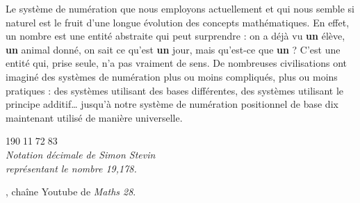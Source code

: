 \vspace*{-2mm}

\begin{debat}
    Le système de numération que nous employons actuellement et qui nous semble si naturel est le fruit d'une longue évolution des concepts mathématiques. En effet, un nombre est une entité abstraite qui peut surprendre : on a déjà vu {\bf un} élève, {\bf un} animal donné, on sait ce qu'est {\bf un} jour, mais qu'est-ce que {\bf un} ? C'est une entité qui, prise seule, n'a pas vraiment de sens. De nombreuses civilisations ont imaginé des systèmes de numération plus ou moins compliqués, plus ou moins pratiques : des systèmes utilisant des bases différentes, des systèmes utilisant le principe additif\dots{} jusqu'à notre système de numération positionnel de base dix maintenant utilisé de manière universelle. \\
    \begin{center}
       \textcolor{B1}{{\huge 19\textcircled{\Large 0}1\textcircled{\Large 1}7\textcircled{\Large2}8\textcircled{\Large 3}} \\ [3mm]
       \it Notation décimale de Simon Stevin \\
       représentant le nombre 19,178.}
    \end{center}
    \bigskip
    \begin{cadre}[B2][F4]
       \begin{center}
          , chaîne Youtube de {\it Maths 28}.
       \end{center}
    \end{cadre}
 \end{debat}